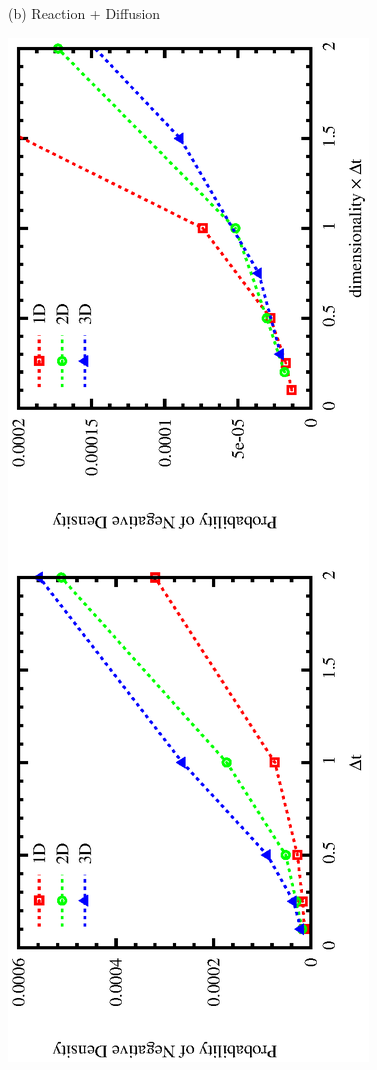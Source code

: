 \documentclass{article}
\begin{document}
\begin{figure}
\begin{center}
(b) Reaction + Diffusion
\vspace{-5mm}
\end{center}
\includegraphics[angle=270,width=\linewidth]{fig1/negdens_react.eps}
\caption{\label{fig_negdens}}
\end{figure}
\end{document}
